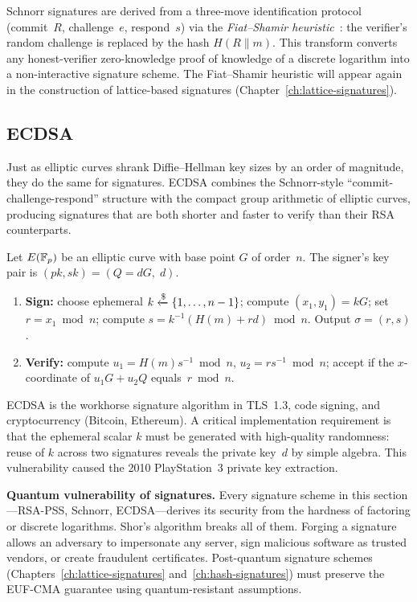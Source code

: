 Schnorr signatures are derived from a three-move identification protocol (commit~$R$, challenge~$e$, respond~$s$) via the \emph{Fiat--Shamir heuristic}~\cite{FiatShamir1986}: the verifier's random challenge is replaced by the hash $H(R \| m)$.  This transform converts any honest-verifier zero-knowledge proof of knowledge of a discrete logarithm into a non-interactive signature scheme.  The Fiat--Shamir heuristic will appear again in the construction of lattice-based signatures (Chapter~\ref{ch:lattice-signatures}).

\subsection{ECDSA}
\label{subsec:ecdsa}

Just as elliptic curves shrank Diffie--Hellman key sizes by an order of magnitude, they do the same for signatures.  ECDSA combines the Schnorr-style ``commit-challenge-respond'' structure with the compact group arithmetic of elliptic curves, producing signatures that are both shorter and faster to verify than their RSA counterparts.

\begin{definition}[ECDSA]
\label{def:ecdsa}
Let $E(\mathbb{F}_p)$ be an elliptic curve with base point $G$ of order~$n$.  The signer's key pair is $(pk, sk) = (Q = dG,\; d)$.
\begin{enumerate}
\item \textbf{Sign:} choose ephemeral $k \getsr \{1, \ldots, n-1\}$; compute $(x_1, y_1) = kG$; set $r = x_1 \bmod n$; compute $s = k^{-1}(H(m) + rd) \bmod n$.  Output $\sigma = (r, s)$.
\item \textbf{Verify:} compute $u_1 = H(m) s^{-1} \bmod n$, $u_2 = r s^{-1} \bmod n$; accept if the $x$-coordinate of $u_1 G + u_2 Q$ equals~$r \bmod n$.
\end{enumerate}
\end{definition}

ECDSA is the workhorse signature algorithm in TLS~1.3, code signing, and cryptocurrency (Bitcoin, Ethereum).  A critical implementation requirement is that the ephemeral scalar $k$ must be generated with high-quality randomness: reuse of $k$ across two signatures reveals the private key~$d$ by simple algebra.  This vulnerability caused the 2010 PlayStation~3 private key extraction.

\begin{svgraybox}
\textbf{Quantum vulnerability of signatures.}  Every signature scheme in this section---RSA-PSS, Schnorr, ECDSA---derives its security from the hardness of factoring or discrete logarithms.  Shor's algorithm breaks all of them.  Forging a signature allows an adversary to impersonate any server, sign malicious software as trusted vendors, or create fraudulent certificates.  Post-quantum signature schemes (Chapters~\ref{ch:lattice-signatures} and~\ref{ch:hash-signatures}) must preserve the EUF-CMA guarantee using quantum-resistant assumptions.
\end{svgraybox}


